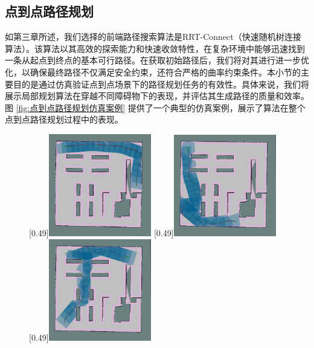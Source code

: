 \documentclass[master,academic]{ysuthesis} %
\begin{document}
		\subsection{点到点路径规划}
		如第三章所述，我们选择的前端路径搜索算法是RRT-Connect（快速随机树连接算法）。该算法以其高效的探索能力和快速收敛特性，在复杂环境中能够迅速找到一条从起点到终点的基本可行路径。在获取初始路径后，我们将对其进行进一步优化，以确保最终路径不仅满足安全约束，还符合严格的曲率约束条件。本小节的主要目的是通过仿真验证点到点场景下的路径规划任务的有效性。具体来说，我们将展示局部规划算法在穿越不同障碍物下的表现，并评估其生成路径的质量和效率。图 \ref{fig:点到点路径规划仿真案例} 提供了一个典型的仿真案例，展示了算法在整个点到点路径规划过程中的表现。
		\begin{figure}[!ht]
			\centering
			\subcaptionbox{\label{fig:single_1}}[0.49\textwidth]{\includegraphics[width=0.4\textwidth]{single_1.png}}
			\subcaptionbox{\label{fig:single_2}}[0.49\textwidth]{\includegraphics[width=0.4\textwidth]{single_2.png}}
			\subcaptionbox{\label{fig:single_3}}[0.49\textwidth]{\includegraphics[width=0.4\textwidth]{single_3.png}}

\end{figure}
\end{document}
